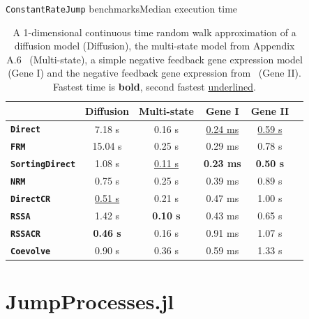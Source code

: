 \documentclass[
  ignorenonframetext,
  aspectratio=169,
  xcolor={dvipsnames,rgb}
]{beamer}
\begin{document}
\begin{frame}{\texttt{ConstantRateJump} benchmarks}{Median execution time}

\begin{table}
\centering
\begin{tabular}{lccccc}
\toprule
 & \multicolumn{1}{c}{\textbf{ Diffusion }} & \multicolumn{1}{c}{\textbf{ Multi-state }} & \multicolumn{1}{c}{\textbf{ Gene I }} & \multicolumn{1}{c}{\textbf{ Gene II }} \\
\hline
\textbf{\texttt{Direct}}         & 7.18 s             & 0.16 s             & \underline{0.24 ms} & \underline{0.59 s} \\
\textbf{\texttt{FRM}}            & 15.04 s            & 0.25 s             & 0.29 ms             & 0.78 s             \\
\textbf{\texttt{SortingDirect}}  & 1.08 s             & \underline{0.11 s} & \textbf{0.23 ms}    & \textbf{0.50 s}    \\
\textbf{\texttt{NRM}}            & 0.75 s             & 0.25 s             & 0.39 ms             & 0.89 s             \\
\textbf{\texttt{DirectCR}}       & \underline{0.51 s} & 0.21 s             & 0.47 ms             & 1.00 s             \\
\textbf{\texttt{RSSA}}           & 1.42 s             & \textbf{0.10 s}    & 0.43 ms             & 0.65 s             \\
\textbf{\texttt{RSSACR}}         & \textbf{0.46 s}    & 0.16 s             & 0.91 ms             & 1.07 s             \\
\textbf{\texttt{Coevolve}}       & 0.90 s             & 0.36 s             & 0.59 ms             & 1.33 s             \\
\bottomrule
\end{tabular}
\caption{A 1-dimensional continuous time random walk approximation of a diffusion model (Diffusion), the multi-state model from Appendix A.6~\citet{marchetti2017} (Multi-state), a simple negative feedback gene expression model (Gene I) and the negative feedback gene expression from~\citet{gupta2018} (Gene II). Fastest time is \textbf{bold}, second fastest \underline{underlined}.}
\end{table}

\end{frame}

\hypertarget{jumpprocesses.jl}{\section{JumpProcesses.jl}\label{jumpprocesses.jl}}
\end{document}
